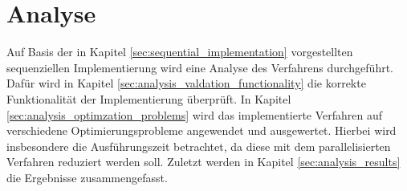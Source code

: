 \chapter{Analyse}
\label{chap:analysis}
Auf Basis der in Kapitel \ref{sec:sequential_implementation} vorgestellten sequenziellen Implementierung wird eine Analyse des Verfahrens durchgeführt. Dafür wird in Kapitel \ref{sec:analysis_valdation_functionality} die korrekte Funktionalität der Implementierung überprüft. In Kapitel \ref{sec:analysis_optimzation_problems} wird das implementierte Verfahren auf verschiedene Optimierungsprobleme angewendet und ausgewertet. Hierbei wird insbesondere die Ausführungszeit betrachtet, da diese mit dem parallelisierten Verfahren reduziert werden soll. Zuletzt werden in Kapitel \ref{sec:analysis_results} die Ergebnisse zusammengefasst. 





